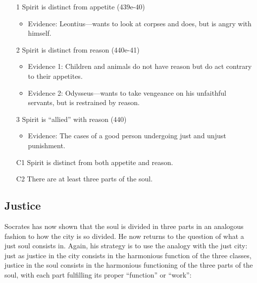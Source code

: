 \documentclass[oneside]{article}
\begin{document}
\begin{enumerate}
\item[1] Spirit is distinct from appetite (439e-40)
\begin{itemize}
\item Evidence: Leontius---wants to look at corpses and does, but is angry with himself.
\end{itemize}
\item[2] Spirit is distinct from reason (440e-41)
\begin{itemize}
\item Evidence 1: Children and animals do not have reason but do act contrary to their appetites.
\item Evidence 2: Odysseus---wants to take vengeance on his unfaithful servants, but is restrained by reason.
\end{itemize}
\item[3] Spirit is ``allied'' with reason (440)
\begin{itemize}
\item Evidence: The cases of a good person undergoing just and unjust punishment.
\end{itemize}
\item[C1] Spirit is distinct from both appetite and reason.
\item[C2] There are at least three parts of the soul.
\end{enumerate}




\subsection*{Justice}
Socrates has now shown that the soul is divided in three parts in an analogous fashion to how the city is so divided. He now returns to the question of what a just soul consists in. Again, his strategy is to use the analogy with the just city: just as justice in the city consists in the harmonious function of the three classes, justice in the soul consists in the harmonious functioning of the three parts of the soul, with each part fulfilling its proper ``function'' or ``work'': 
\end{document}
